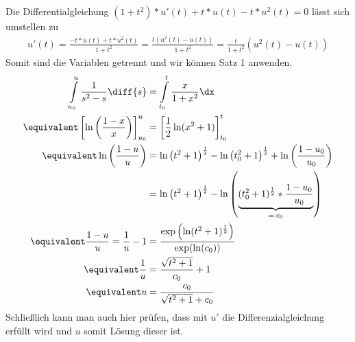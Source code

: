 \begin{exercisePage}
	\pagebreak
	Die Differentialgleichung $(1+t^2)*u'(t) + t*u(t) - t*u^2(t) = 0$ lässt sich umstellen zu
	\begin{align*}
	u'(t) = \frac{-t*u(t) + t*u^2(t)}{1+t^2} = \frac{t (u^2(t) - u(t) )}{1+t^2} = \frac{t}{1+t^2} \left( u^2(t) - u(t) \right)
	\end{align*}
	Somit sind die Variablen getrennt und wir können Satz 1 anwenden.
	\begin{align*}
	\int \limits_{u_0}^{u}{\frac{1}{s^2-s} \diff{s}} & = \int \limits_{t_0}^{t}{\frac{x}{1+x^2} \dx} \\
	\equivalent \left[ \ln\left(\frac{1-x}{x}\right) \right]_{u_0}^{u} &= \left[ \frac{1}{2} \ln(x^2+1) \right]_{t_0}^t \\
	\equivalent \ln\left(\frac{1-u}{u}\right) &= \ln\left(t^2+1\right)^{\frac{1}{2}} - \ln\left(t_0^2+1\right)^{\frac{1}{2}} + \ln\left(\frac{1-u_0}{u_0}\right) \\
	&= \ln\left(t^2+1\right)^{\frac{1}{2}} - \ln\left(\underbrace{(t_0^2+1)^{\frac{1}{2}} * \frac{1-u_0}{u_0}}_{=: c_0}\right) \\
	\equivalent \frac{1-u}{u} = \frac{1}{u} -1 &= \frac{\exp\left(\ln(t^2+1)^\frac{1}{2}\right)}{\exp(\ln(c_0))} \\
	\equivalent \frac{1}{u} &= \frac{\sqrt{t^2+1}}{c_0} + 1 \\
	\equivalent u &= \frac{c_0}{\sqrt{t^2+1}+c_0}
	\end{align*}
	Schließlich kann man auch hier prüfen, dass mit $u'$ die Differenzialgleichung erfüllt wird und $u$ somit Lösung dieser ist.
\end{exercisePage}